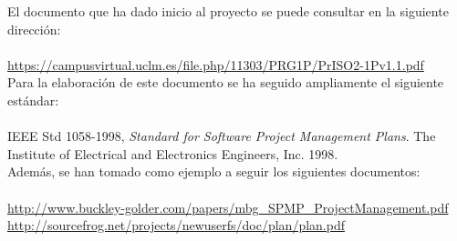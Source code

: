 El documento que ha dado inicio al proyecto se puede consultar en la siguiente
dirección:\\
\\
{\small
\url{https://campusvirtual.uclm.es/file.php/11303/PRG1P/PrISO2-1Pv1.1.pdf
}}\\

Para la elaboración de este documento se ha seguido ampliamente el siguiente
estándar:\\
\\
IEEE Std 1058-1998, \textit{Standard for Software Project Management Plans}.
The Institute of Electrical and Electronics Engineers, Inc. 1998.\\

Además, se han tomado como ejemplo a seguir los siguientes documentos:\\
\\
{\small
\url{http://www.buckley-golder.com/papers/mbg_SPMP_ProjectManagement.pdf}\\
\url{http://sourcefrog.net/projects/newuserfs/doc/plan/plan.pdf}\\
}\\
